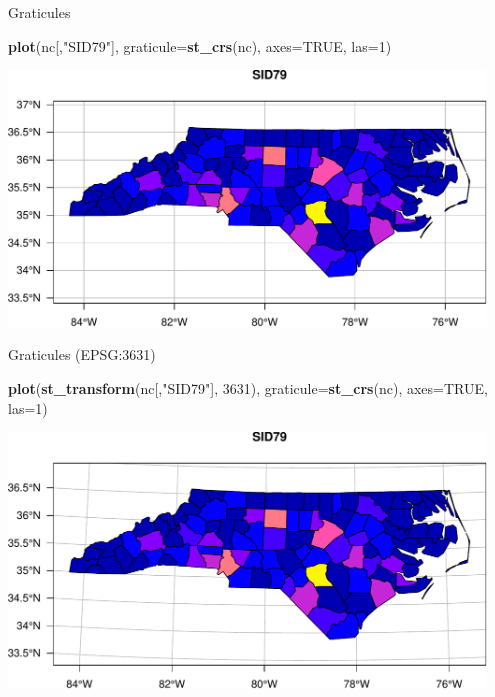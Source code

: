 \documentclass[11pt,ignorenonframetext,]{beamer}
\newenvironment{Shaded}{}{}
\newcommand{\KeywordTok}[1]{\textcolor[rgb]{0.00,0.44,0.13}{\textbf{#1}}}
\newcommand{\DataTypeTok}[1]{\textcolor[rgb]{0.56,0.13,0.00}{#1}}
\newcommand{\DecValTok}[1]{\textcolor[rgb]{0.25,0.63,0.44}{#1}}
\newcommand{\StringTok}[1]{\textcolor[rgb]{0.25,0.44,0.63}{#1}}
\newcommand{\OtherTok}[1]{\textcolor[rgb]{0.00,0.44,0.13}{#1}}
\newcommand{\NormalTok}[1]{#1}
\let\oldShaded\Shaded
\let\endoldShaded\endShaded
\renewenvironment{Shaded}{\footnotesize\begin{spacing}{0.9}\oldShaded}{\endoldShaded\end{spacing}}
\let\oldverbatim\verbatim
\let\endoldverbatim\endverbatim
\newcommand{\scriptoutput}{
  \renewenvironment{Shaded}{\scriptsize\begin{spacing}{0.9}\oldShaded}{\endoldShaded\end{spacing}}
  \renewenvironment{verbatim}{\scriptsize\begin{spacing}{0.9}\oldverbatim}{\endoldverbatim\end{spacing}}
}
\begin{document}
\begin{frame}[fragile,t]{Graticules}

\scriptoutput

\begin{Shaded}
\begin{Highlighting}[]
\KeywordTok{plot}\NormalTok{(nc[,}\StringTok{"SID79"}\NormalTok{], }\DataTypeTok{graticule=}\KeywordTok{st_crs}\NormalTok{(nc), }\DataTypeTok{axes=}\OtherTok{TRUE}\NormalTok{, }\DataTypeTok{las=}\DecValTok{1}\NormalTok{)}
\end{Highlighting}
\end{Shaded}

\begin{center}\includegraphics[width=0.95\textwidth]{Lec17_files/figure-beamer/unnamed-chunk-4-1} \end{center}

\end{frame}

\begin{frame}[fragile,t]{Graticules (EPSG:3631)}

\scriptoutput

\begin{Shaded}
\begin{Highlighting}[]
\KeywordTok{plot}\NormalTok{(}\KeywordTok{st_transform}\NormalTok{(nc[,}\StringTok{"SID79"}\NormalTok{], }\DecValTok{3631}\NormalTok{), }\DataTypeTok{graticule=}\KeywordTok{st_crs}\NormalTok{(nc), }\DataTypeTok{axes=}\OtherTok{TRUE}\NormalTok{, }\DataTypeTok{las=}\DecValTok{1}\NormalTok{)}
\end{Highlighting}
\end{Shaded}

\begin{center}\includegraphics[width=0.95\textwidth]{Lec17_files/figure-beamer/unnamed-chunk-5-1} \end{center}

\end{frame}
\end{document}

